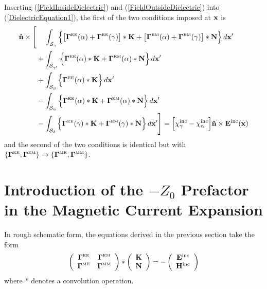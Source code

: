 \documentclass[letterpaper]{article}
\begin{document}
Inserting (\ref{FieldInsideDielectric}) and 
(\ref{FieldOutsideDielectric}) into (\ref{DielectricEquation1}), 
the first of the two conditions imposed at $\mathbf{x}$ is
\begin{align}
\mathbf{\hat n}\times
 \Bigg[  &\hphantom{+}\,\,\int_{\mathcal{S_\gamma}}
           \Big\{ \big[\boldsymbol{\Gamma}^{\hbox{\tiny{EE}}}(\alpha) + \boldsymbol{\Gamma}^{\hbox{\tiny{EE}}}(\gamma)\big]
                   *\mathbf{K} 
                + \big[\boldsymbol{\Gamma}^{\hbox{\tiny{EM}}}(\alpha) + \boldsymbol{\Gamma}^{\hbox{\tiny{EM}}}(\gamma)\big]
                   *\mathbf{N} 
           \Big\} \, d\mathbf{x}^\prime
\nonumber \\
         &+\int_{\mathcal{S}_{\gamma^\prime}}
           \Big\{ \boldsymbol{\Gamma}^{\hbox{\tiny{EE}}}(\alpha)*\mathbf{K} 
                 +\boldsymbol{\Gamma}^{\hbox{\tiny{EM}}}(\alpha)*\mathbf{N} 
           \Big\} \, d\mathbf{x}^\prime
\nonumber \\
         &+\int_{\mathcal{S_\beta}} 
           \Big\{ \boldsymbol{\Gamma}^{\hbox{\tiny{EE}}}(\alpha)*\mathbf{K} \Big\} \, d\mathbf{x}^\prime
\nonumber \\
         &-\int_{\mathcal{S_\alpha}}
           \Big\{ \boldsymbol{\Gamma}^{\hbox{\tiny{EE}}}(\alpha)*\mathbf{K} 
                 +\boldsymbol{\Gamma}^{\hbox{\tiny{EM}}}(\alpha)*\mathbf{N} 
           \Big\} \, d\mathbf{x}^\prime
\nonumber \\
         &-\int_{\mathcal{S_\delta}} 
           \Big\{ \boldsymbol{\Gamma}^{\hbox{\tiny{EE}}}(\gamma)*\mathbf{K} 
                 +\boldsymbol{\Gamma}^{\hbox{\tiny{EM}}}(\gamma)*\mathbf{N} 
           \Big\} \, d\mathbf{x}^\prime
 \Bigg]
= \Big[\chi^{\hbox{\scriptsize{inc}}}_\gamma - \chi^{\hbox{\scriptsize{inc}}}_\alpha\Big] 
   \mathbf{\hat n}\times \mathbf{E}^{\hbox{\scriptsize{inc}}}(\mathbf{x})
\label{DielectricEquationBreakdown}
\end{align}
and the second of the two conditions is identical 
but with 
$\{\boldsymbol{\Gamma}^{\hbox{\tiny{EE}}}, \boldsymbol{\Gamma}^{\hbox{\tiny{EM}}}\} \to 
 \{\boldsymbol{\Gamma}^{\hbox{\tiny{ME}}}, \boldsymbol{\Gamma}^{\hbox{\tiny{MM}}}\}$.

\newpage
\section{Introduction of the $-Z_0$ Prefactor in the 
         Magnetic Current Expansion} 

In rough schematic form, the equations derived in the 
previous section take the form 
$$ \left( \begin{array}{cc}
   \boldsymbol{\Gamma}^{\hbox{\tiny{EE}}} & \boldsymbol{\Gamma}^{\hbox{\tiny{EM}}} \\
   \boldsymbol{\Gamma}^{\hbox{\tiny{ME}}} & \boldsymbol{\Gamma}^{\hbox{\tiny{MM}}} \\
   \end{array} \right)
   *
   \left( \begin{array}{c} \mathbf{K} \\  \mathbf{N}\end{array}\right)
   = 
   -
   \left( \begin{array}{c}
   \mathbf{E}^{\hbox{\scriptsize{inc}}} \\
   \mathbf{H}^{\hbox{\scriptsize{inc}}} \\
   \end{array}\right)
$$
where $*$ denotes a convolution operation.
\end{document}
